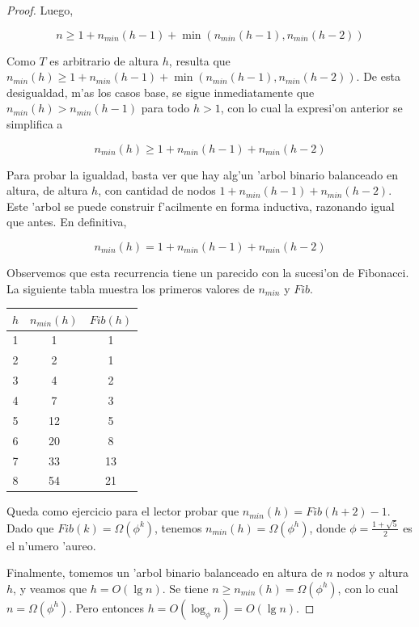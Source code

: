 \begin{teo}
\begin{proof}
	
	Luego,
	
	\[n \geq 1 + n_{min}(h - 1) + \min(n_{min}(h - 1), n_{min}(h - 2))\]
	
Como $T$ es arbitrario de altura $h$, resulta que $n_{min}(h) \geq 1 + n_{min}(h - 1) + \min(n_{min}(h - 1), n_{min}(h - 2))$. De esta desigualdad, m'as los casos base, se sigue inmediatamente que $n_{min}(h) > n_{min}(h - 1)$ para todo $h > 1$, con lo cual la expresi'on anterior se simplifica a

\[n_{min}(h) \geq 1 + n_{min}(h - 1) + n_{min}(h - 2)\]

Para probar la igualdad, basta ver que hay alg'un 'arbol binario balanceado en altura, de altura $h$, con cantidad de nodos $1 + n_{min}(h - 1) + n_{min}(h - 2)$. Este 'arbol se puede construir f'acilmente en forma inductiva, razonando igual que antes. En definitiva,

\[n_{min}(h) = 1 + n_{min}(h - 1) + n_{min}(h - 2)\]

Observemos que esta recurrencia tiene un parecido con la sucesi'on de Fibonacci. La siguiente tabla muestra los primeros valores de $n_{min}$ y $Fib$.

\begin{center}
\begin{tabular}{|c|c|c|}
\hline
$h$ & $n_{min}(h)$ & $Fib(h)$\\
\hline
\hline
1 & 1 & 1\\
2 & 2 & 1\\
3 & 4 & 2\\
4 & 7 & 3\\
5 & 12 & 5\\
6 & 20 & 8\\
7 & 33 & 13\\
8 & 54 & 21\\
\hline
\end{tabular}
\end{center}

Queda como ejercicio para el lector probar que $n_{min}(h) = Fib(h + 2) - 1$. Dado que $Fib(k) = \Omega(\phi^k)$, tenemos $n_{min}(h) = \Omega(\phi^h)$, donde $\phi = \frac{1 + \sqrt{5}}{2}$ es el n'umero 'aureo.

Finalmente, tomemos un 'arbol binario balanceado en altura de $n$ nodos y altura $h$, y veamos que $h = O(\lg n)$. Se tiene $n \geq n_{min}(h) = \Omega(\phi^h)$, con lo cual $n = \Omega(\phi^h)$. Pero entonces $h = O(\log_{\phi} n) = O(\lg n)$.
\end{proof}
\end{teo}

